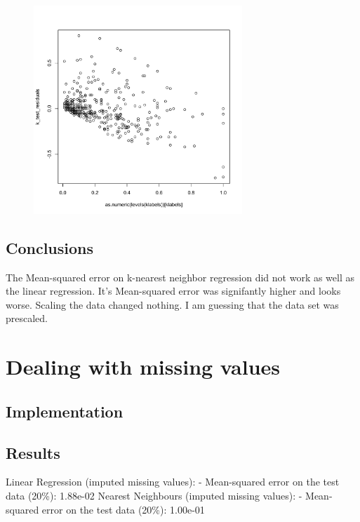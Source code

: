 \documentclass[12pt,a4paper]{article}
\begin{document}
\begin{singlespace}
\vspace{-0.5cm}
\begin{figure}[h!]
    \centering
    \includegraphics[width=0.7\textwidth,trim= 0 0 20 30, clip]{NN_regression_residuals.pdf}
\end{figure}
\FloatBarrier


\subsection{Conclusions}
The Mean-squared error on k-nearest neighbor regression did not work as well as the
 linear regression. It's  Mean-squared error was signifantly higher and looks worse.
 Scaling the data changed nothing. I am guessing that the data set was prescaled.

\section{Dealing with missing values}
\subsection{Implementation}




\subsection{Results}
Linear Regression (imputed missing values):
 - Mean-squared error on the test data (20\%): 1.88e-02
Nearest Neighbours (imputed missing values):
 - Mean-squared error on the test data (20\%): 1.00e-01


\end{singlespace}
\end{document}
